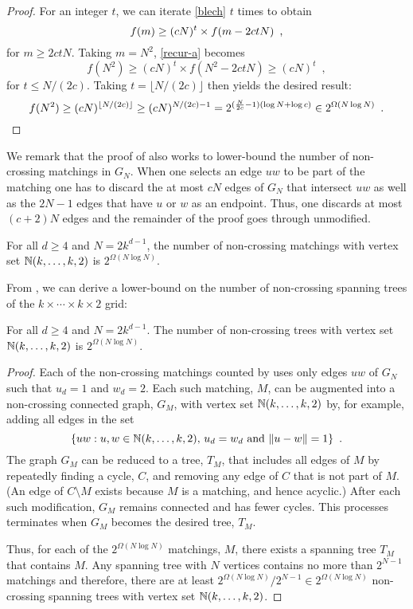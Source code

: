 \documentclass{patmorin}
\newcommand{\n}{N}
\begin{document}
\begin{proof}
  For an integer $t$, we can iterate \eqref{blech} $t$ times to obtain
  \begin{equation}
     f(m) \ge (c\n)^t\times f(m-2ct\n) \enspace ,
     \eqlabel{recur-a}
  \end{equation} 
  for $m\ge 2ct\n$.  Taking $m=\n^2$, \eqref{recur-a} becomes
  \[
     f(\n^2) \ge (c\n)^t\times f(\n^2-2ct\n) \ge (c\n)^t \enspace ,
  \]
  for $t \le\n/(2c)$.  Taking $t=\lfloor \n/(2c)\rfloor$ then yields the
  desired result:
  \[
     f(\n^2) \ge (c\n)^{\lfloor\n/(2c)\rfloor} 
            \ge (c\n)^{\n/(2c) - 1} 
            = 2^{(\frac{\n}{2c}-1)(\log\n+\log c)}
            \in 2^{\Omega(\n\log\n)} \enspace . \qedhere
  \]
\end{proof}

We remark that the proof of  also works to lower-bound
the number of non-crossing matchings in $G_\n$.  When one selects an edge
$uw$ to be part of the matching one has to discard the at most $c\n$
edges of $G_\n$ that intersect $uw$ as well as the $2\n-1$ edges that
have $u$ or $w$ as an endpoint.  Thus, one discards at most $(c+2)\n$
edges and the remainder of the proof goes through unmodified.

\begin{cor}
  For all $d\ge 4$ and $\n=2k^{d-1}$, the number of non-crossing matchings
  with vertex set $\mathbb{N}(k,\ldots,k,2)$ is $2^{\Omega(\n\log\n)}$.
\end{cor}

From , we can derive a lower-bound on the number of
non-crossing spanning trees of the $k\times\cdots\times k\times 2$ grid:
\begin{cor}
  For all $d\ge 4$ and $\n=2k^{d-1}$.  The number of non-crossing trees with
  vertex set $\mathbb{N}(k,\ldots,k,2)$ is $2^{\Omega(\n\log\n)}$.
\end{cor}

\begin{proof}
  Each of the non-crossing matchings counted by  uses
  only edges $uw$ of $G_\n$ such that $u_d=1$ and $w_d=2$.  Each such
  matching, $M$, can be augmented into a non-crossing connected graph,
  $G_M$, with vertex set $\mathbb{N}(k,\ldots,k,2)$ by, for example, adding all
  edges in the set
  \[
     \{ uw :\mbox{$u,w\in \mathbb{N}(k,\ldots,k,2)$, $u_d=w_d$ and $\|u-w\|=1$} \} \enspace .  
  \] 
  The graph $G_M$ can be reduced to a tree, $T_M$, that includes all edges
  of $M$ by repeatedly finding a cycle, $C$, and removing any edge of $C$
  that is not part of $M$.  (An edge of $C\setminus M$ exists because $M$
  is a matching, and hence acyclic.)  After each such modification, $G_M$
  remains connected and has fewer cycles.  This processes terminates
  when $G_M$ becomes the desired tree, $T_M$.

  Thus, for each of the $2^{\Omega(\n\log\n)}$ matchings, $M$, there
  exists a spanning tree $T_M$ that contains $M$.  Any spanning tree
  with $\n$ vertices contains no more than $2^{\n-1}$ matchings and therefore,
  there are at least $2^{\Omega(\n\log\n)}/2^{\n-1}\in 2^{\Omega(\n\log\n)}$
  non-crossing spanning trees with vertex set $\mathbb{N}(k,\ldots,k,2)$.
\end{proof}
\end{document}

